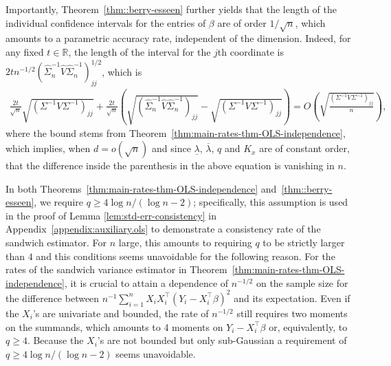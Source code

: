 \documentclass{article}
\begin{document}
 Importantly,  Theorem~\ref{thm::berry-esseen} further yields that the length of the individual confidence intervals for the entries of $\beta$ are of order $1/\sqrt{n}$, which amounts to a parametric accuracy rate, independent of the dimension. Indeed, for any fixed $t \in \mathbb{R}$, the length of the interval for the $j$th coordinate is ${2tn^{-1/2}}(\widehat{\Sigma}_n^{-1}\widehat{V}\widehat{\Sigma}_n^{-1})_{jj}^{1/2}$, which is
 \begin{align*}
 
 \frac{2t}{\sqrt{n}} \sqrt{({\Sigma}^{-1}V{\Sigma}^{-1})_{jj}}
 + \frac{2t}{\sqrt{n}} \left( \sqrt{(\widehat{\Sigma}_n^{-1}\widehat{V}\widehat{\Sigma}_n^{-1})_{jj}} - \sqrt{({\Sigma}^{-1}V{\Sigma}^{-1})_{jj}}  \right) = O \left( \sqrt{\frac{({\Sigma}^{-1}V{\Sigma}^{-1})_{jj}}{n}} \right),
 \end{align*}
 where the bound stems from Theorem~\ref{thm:main-rates-thm-OLS-independence}, which  implies,  when $d = o(\sqrt{n})$ and since $\underline{\lambda}$, $\overline{\lambda}$, $q$ and $K_x$ are of constant order, that the difference inside the parenthesis in the above equation is vanishing in $n$.
 
 In both Theorems~\ref{thm:main-rates-thm-OLS-independence} and~\ref{thm::berry-esseen}, we require $q \ge 4\log n/(\log n - 2)$; specifically, this assumption is used in the proof of Lemma \ref{lem:std-err-consistency} in Appendix~\ref{appendix:auxiliary.ols} to demonstrate a consistency rate of the sandwich estimator. For $n$ large, this amounts to requiring $q$ to be strictly larger than $4$ and this conditions seems unavoidable for the following reason. For the rates of the sandwich variance estimator in Theorem~\ref{thm:main-rates-thm-OLS-independence}, it is crucial to attain a dependence of $n^{-1/2}$ on the sample size for the difference between $n^{-1}\sum_{i=1}^n X_iX_i^{\top}(Y_i - X_i^{\top}\beta)^2$ and its expectation. Even if the $X_i$'s are univariate and bounded, the rate of $n^{-1/2}$ still requires two moments on the summands, which amounts to 4 moments on $Y_i - X_i^{\top}\beta$ or, equivalently, to $q \ge 4$. Because the $X_i$'s are not bounded but only sub-Gaussian a requirement of $q \ge 4\log n/(\log n - 2)$ seems unavoidable.
 
 
 
\end{document}
